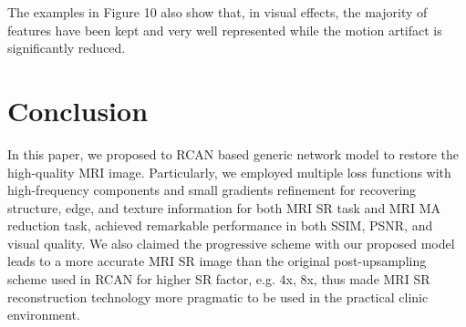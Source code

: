 \documentclass[runningheads]{llncs}
\begin{document}
The examples in Figure 10 also show that, in visual effects, the majority of features have been kept and very well represented while the motion artifact is significantly reduced. 



\section{Conclusion}
In this paper, we proposed to RCAN based generic network model to restore the high-quality MRI image. Particularly, we employed multiple loss functions with high-frequency components and small gradients refinement for recovering structure, edge, and texture information for both MRI SR task and MRI MA reduction task, achieved remarkable performance in both SSIM, PSNR, and visual quality. We also claimed the progressive scheme with our proposed model leads to a more accurate MRI SR image than the original post-upsampling scheme used in RCAN for higher SR factor, e.g. 4x, 8x, thus made MRI SR reconstruction technology more pragmatic to be used in the practical clinic environment.
\end{document}
